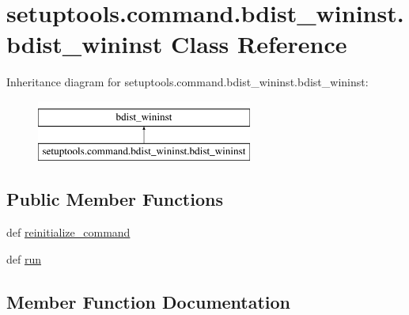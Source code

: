\hypertarget{classsetuptools_1_1command_1_1bdist__wininst_1_1bdist__wininst}{}\section{setuptools.\+command.\+bdist\+\_\+wininst.\+bdist\+\_\+wininst Class Reference}
\label{classsetuptools_1_1command_1_1bdist__wininst_1_1bdist__wininst}
Inheritance diagram for setuptools.\+command.\+bdist\+\_\+wininst.\+bdist\+\_\+wininst\+:\begin{figure}[H]
\begin{center}
\leavevmode
\includegraphics[height=2.000000cm]{classsetuptools_1_1command_1_1bdist__wininst_1_1bdist__wininst}
\end{center}
\end{figure}
\subsection*{Public Member Functions}
\begin{DoxyCompactItemize}
\item 
def \hyperlink{classsetuptools_1_1command_1_1bdist__wininst_1_1bdist__wininst_a9ec5565ec84afe2c85a7d05d8397ff49}{reinitialize\+\_\+command}
\item 
def \hyperlink{classsetuptools_1_1command_1_1bdist__wininst_1_1bdist__wininst_af33c0b8c300278198fcb243910fda8d2}{run}
\end{DoxyCompactItemize}


\subsection{Member Function Documentation}
\hypertarget{classsetuptools_1_1command_1_1bdist__wininst_1_1bdist__wininst_a9ec5565ec84afe2c85a7d05d8397ff49}{}
